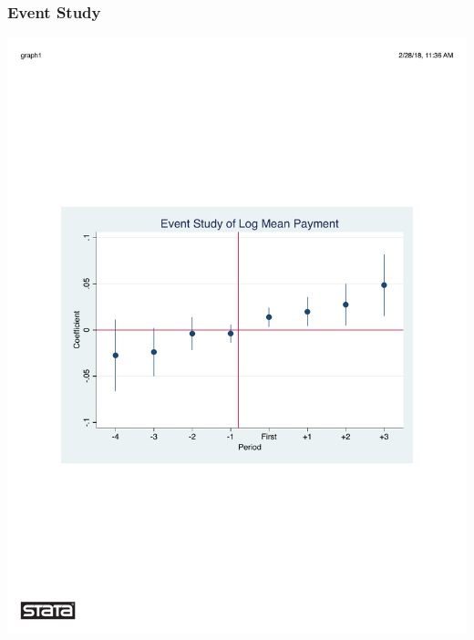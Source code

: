 \documentclass[ucs,9pt]{beamer}
\begin{document}
\begin{frame}
\frametitle{Event Study}
\begin{center}
\includegraphics[scale=0.55]{event}
\end{center}
\end{frame}
\end{document}
